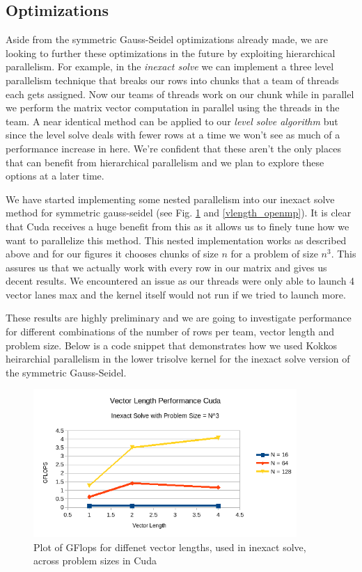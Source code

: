 \documentclass{ccr15}
\begin{document}
\subsection{Optimizations}
Aside from the symmetric Gauss-Seidel optimizations already made, we are looking to further these
optimizations in the future by exploiting hierarchical parallelism. For example, in the \emph{inexact
solve} we can implement a three level parallelism technique that breaks our rows into chunks that 
a team of threads each gets assigned. Now our teams of threads work on our chunk while in
parallel we perform the matrix vector computation in parallel using the threads in the team. A
near identical method can be applied to our \emph{level solve algorithm} but since the level solve deals
with fewer rows at a time we won't see as much of a performance increase in here. We're confident
that these aren't the only places that can benefit from hierarchical parallelism and we plan to
explore these options at a later time.

We have started implementing some nested parallelism into our inexact solve method for symmetric gauss-seidel (see Fig. \ref{vlength_cuda} and \ref{vlength_openmp}).
 It is clear that Cuda receives a huge benefit
from this as it allows us to finely tune how we want to parallelize this method. This nested implementation works as described
above and for our figures it chooses chunks of size $n$ for a problem of size $n^3$. This assures us that we 
actually work with every row in our matrix and gives us decent results. We encountered an issue as our threads
were only able to launch 4 vector lanes max and the kernel itself would not run if we tried to launch more. 

These results
are highly preliminary and we are going to investigate performance for different combinations of the number of rows per team, vector length and problem size.
Below is a code snippet that demonstrates how we used Kokkos heirarchial parallelism in the lower trisolve
kernel for the inexact solve version of the symmetric Gauss-Seidel.
\lstset{language=[Visual]C++}


\begin{figure}[H]
  \centering
  \includegraphics[width=10cm]{plots/ZAB-VectorLengthCuda.png}
  \caption{Plot of GFlops for diffenet vector lengths, used in inexact solve, across problem sizes in Cuda}
  \label{vlength_cuda}
\end{figure}
\end{document}

